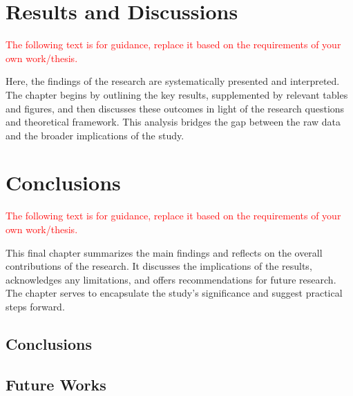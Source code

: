 \documentclass{uethesis}
\begin{document}
\chapter{Results and Discussions} \label{chap:res}
\textcolor{red}{The following text is for guidance, replace it based on the requirements of your own work/thesis.}

Here, the findings of the research are systematically presented and interpreted. The chapter begins by outlining the key results, supplemented by relevant tables and figures, and then discusses these outcomes in light of the research questions and theoretical framework. This analysis bridges the gap between the raw data and the broader implications of the study.



\chapter{Conclusions} \label{chap:conc}
\textcolor{red}{The following text is for guidance, replace it based on the requirements of your own work/thesis.}

This final chapter summarizes the main findings and reflects on the overall contributions of the research. It discusses the implications of the results, acknowledges any limitations, and offers recommendations for future research. The chapter serves to encapsulate the study’s significance and suggest practical steps forward.

\section{Conclusions}

\section{Future Works}

\clearpage
\end{document}
